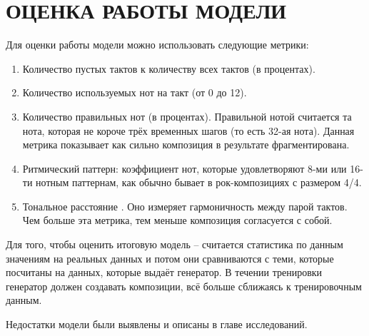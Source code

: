 \section{ОЦЕНКА РАБОТЫ МОДЕЛИ}
    Для оценки работы модели можно использовать следующие метрики:
    \begin{enumerate}
        \item Количество пустых тактов к количеству всех тактов (в процентах).
        \item Количество используемых нот на такт (от 0 до 12).
        \item Количество правильных нот (в процентах). Правильной нотой считается та нота, которая не короче трёх временных шагов (то есть 32-ая нота). Данная метрика показывает как сильно композиция в результате фрагментирована.
        \item Ритмический паттерн: коэффициент нот, которые удовлетворяют 8-ми или 16-ти нотным паттернам, как обычно бывает в рок-композициях с размером 4/4.
        \item Тональное расстояние \cite{tonal-distance}. Оно измеряет гармоничность между парой тактов. Чем больше эта метрика, тем меньше композиция согласуется с собой.
    \end{enumerate}
    
    Для того, чтобы оценить итоговую модель -- считается статистика по данным значениям на реальных данных и потом они сравниваются с теми, которые посчитаны на данных, которые выдаёт генератор. В течении тренировки генератор должен создавать композиции, всё больше сближаясь к тренировочным данным.
    
    Недостатки модели были выявлены и описаны в главе исследований.